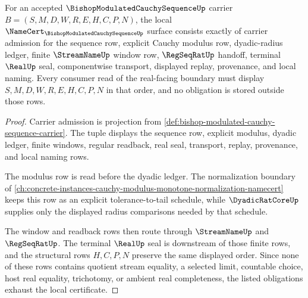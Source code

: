 \begin{theorem}
\label{thm:bishop-modulated-cauchy-sequence-namecert-obligations}
For an accepted $\BishopModulatedCauchySequenceUp$ carrier $B=(S,M,D,W,R,E,H,C,P,N)$, the local $\NameCert_{\BishopModulatedCauchySequenceUp}$ surface consists exactly of carrier admission for the sequence row, explicit Cauchy modulus row, dyadic-radius ledger, finite $\StreamNameUp$ window row, $\RegSeqRatUp$ handoff, terminal $\RealUp$ seal, componentwise transport, displayed replay, provenance, and local naming. Every consumer read of the real-facing boundary must display $S,M,D,W,R,E,H,C,P,N$ in that order, and no obligation is stored outside those rows.
\end{theorem}
\begin{proof}
Carrier admission is projection from \autoref{def:bishop-modulated-cauchy-sequence-carrier}. The tuple displays the sequence row, explicit modulus, dyadic ledger, finite windows, regular readback, real seal, transport, replay, provenance, and local naming rows.

The modulus row is read before the dyadic ledger. The normalization boundary of \autoref{ch:concrete-instances-cauchy-modulus-monotone-normalization-namecert} keeps this row as an explicit tolerance-to-tail schedule, while $\DyadicRatCoreUp$ supplies only the displayed radius comparisons needed by that schedule.

The window and readback rows then route through $\StreamNameUp$ and $\RegSeqRatUp$. The terminal $\RealUp$ seal is downstream of those finite rows, and the structural rows $H,C,P,N$ preserve the same displayed order. Since none of these rows contains quotient stream equality, a selected limit, countable choice, host real equality, trichotomy, or ambient real completeness, the listed obligations exhaust the local certificate.
\end{proof}

